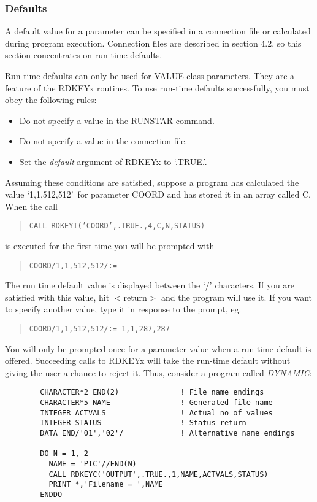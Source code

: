 \documentclass{article}
\begin{document}
\subsubsection {Defaults}
A default value for a parameter can be specified in a connection file or
calculated during program execution.
Connection files are described in section 4.2, so this section concentrates
on run-time defaults.

Run-time defaults can only be used for VALUE class parameters.
They are a feature of the RDKEYx routines.
To use run-time defaults successfully, you must obey the following rules:
\begin{itemize}
\item Do not specify a value in the RUNSTAR command.
\item Do not specify a value in the connection file.
\item Set the {\em default} argument of RDKEYx to `.TRUE.'.
\end{itemize}
Assuming these conditions are satisfied,
suppose a program has calculated the value `1,1,512,512'\ for parameter
COORD and has stored it in an array called C.
When the call
\begin{quote}
{\tt CALL RDKEYI('COORD',.TRUE.,4,C,N,STATUS)}
\end{quote}
is executed for the first time you will be prompted with
\begin{quote}
{\tt COORD/1,1,512,512/:=}
\end{quote}
The run time default value is displayed between the `/' characters.
If you are satisfied with this value, hit $<$return$>$ and the program will use it.
If you want to specify another value, type it in response to the prompt, eg.
\begin{quote}
{\tt COORD/1,1,512,512/:= 1,1,287,287}
\end{quote}
You will only be prompted once for a parameter value when a run-time default
is offered.
Succeeding calls to RDKEYx will take the run-time default without giving the
user a chance to reject it.
Thus, consider a program called {\em DYNAMIC}:
\begin{verbatim}
        CHARACTER*2 END(2)              ! File name endings
        CHARACTER*5 NAME                ! Generated file name
        INTEGER ACTVALS                 ! Actual no of values
        INTEGER STATUS                  ! Status return
        DATA END/'01','02'/             ! Alternative name endings

        DO N = 1, 2
          NAME = 'PIC'//END(N)
          CALL RDKEYC('OUTPUT',.TRUE.,1,NAME,ACTVALS,STATUS)
          PRINT *,'Filename = ',NAME
        ENDDO
\end{verbatim}
\end{document}
